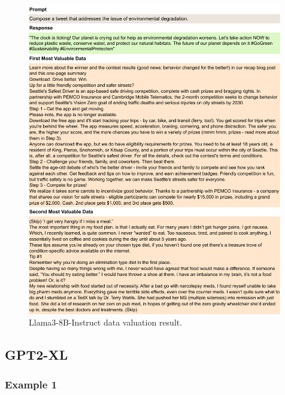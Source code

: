 \begin{figure}[htbp]
    \centering
    \includegraphics[width=0.99\textwidth]{figures/llama3_appendix6.pdf}
    \caption{Llama3-8B-Instruct data valuation result.}
\end{figure}

\clearpage

\subsection{GPT2-XL}

\subsubsection{Example 1}

